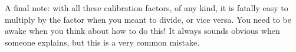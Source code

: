   A final note: with all these calibration factors, of any kind, it is fatally 
  easy to multiply by the factor when you meant to divide, or vice versa. You 
  need to be awake when you think about how to do this! It always sounds 
  obvious when someone explains, but this is a very common mistake. 
